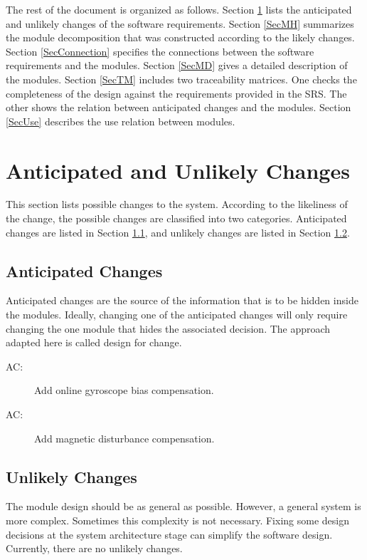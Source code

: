\documentclass[12pt, titlepage]{article}
\newcounter{acnum}
\newcommand{\actheacnum}{AC\theacnum}
\begin{document}
The rest of the document is organized as follows. Section \ref{SecChange} lists the anticipated and
unlikely changes of the software requirements. Section \ref{SecMH} summarizes the module
decomposition that was constructed according to the likely changes. Section \ref{SecConnection}
specifies the connections between the software requirements and the modules. Section \ref{SecMD}
gives a detailed description of the modules. Section \ref{SecTM} includes two traceability matrices.
One checks the completeness of the design against the requirements provided in the SRS. The other
shows the relation between anticipated changes and the modules. Section \ref{SecUse} describes the
use relation between modules.

\section{Anticipated and Unlikely Changes} \label{SecChange}

This section lists possible changes to the system. According to the likeliness of the change, the
possible changes are classified into two categories. Anticipated changes are listed in Section
\ref{SecAchange}, and unlikely changes are listed in Section \ref{SecUchange}.

\subsection{Anticipated Changes} \label{SecAchange}

Anticipated changes are the source of the information that is to be hidden inside the modules.
Ideally, changing one of the anticipated changes will only require changing the one module that
hides the associated decision. The approach adapted here is called design for change.

\begin{description}
\item[ \actheacnum \label{lc:gyro}:] Add online gyroscope bias compensation.
\item[ \actheacnum \label{lc:mag}:] Add magnetic disturbance compensation.
\end{description}

\subsection{Unlikely Changes} \label{SecUchange}

The module design should be as general as possible. However, a general system is more complex.
Sometimes this complexity is not necessary. Fixing some design decisions at the system architecture
stage can simplify the software design. Currently, there are no unlikely changes.
\end{document}
